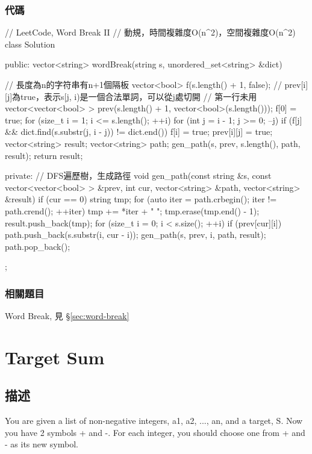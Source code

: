 \subsubsection{代碼}
\begin{Code}
// LeetCode, Word Break II
// 動規，時間複雜度O(n^2)，空間複雜度O(n^2)
class Solution {
public:
    vector<string> wordBreak(string s, unordered_set<string> &dict) {
        // 長度為n的字符串有n+1個隔板
        vector<bool> f(s.length() + 1, false);
        // prev[i][j]為true，表示s[j, i)是一個合法單詞，可以從j處切開
        // 第一行未用
        vector<vector<bool> > prev(s.length() + 1, vector<bool>(s.length()));
        f[0] = true;
        for (size_t i = 1; i <= s.length(); ++i) {
            for (int j = i - 1; j >= 0; --j) {
                if (f[j] && dict.find(s.substr(j, i - j)) != dict.end()) {
                    f[i] = true;
                    prev[i][j] = true;
                }
            }
        }
        vector<string> result;
        vector<string> path;
        gen_path(s, prev, s.length(), path, result);
        return result;

    }
private:
    // DFS遍歷樹，生成路徑
    void gen_path(const string &s, const vector<vector<bool> > &prev,
            int cur, vector<string> &path, vector<string> &result) {
        if (cur == 0) {
            string tmp;
            for (auto iter = path.crbegin(); iter != path.crend(); ++iter)
                tmp += *iter + " ";
            tmp.erase(tmp.end() - 1);
            result.push_back(tmp);
        }
        for (size_t i = 0; i < s.size(); ++i) {
            if (prev[cur][i]) {
                path.push_back(s.substr(i, cur - i));
                gen_path(s, prev, i, path, result);
                path.pop_back();
            }
        }
    }
};
\end{Code}


\subsubsection{相關題目}
\begindot
\item Word Break, 見 \S \ref{sec:word-break}
\myenddot

\section{Target Sum}
\label{sec:target-sum}

\subsection{描述}
You are given a list of non-negative integers, a1, a2, ..., an, and a target, S. Now you have 2 symbols + and -. For each integer, you should choose one from + and - as its new symbol.


